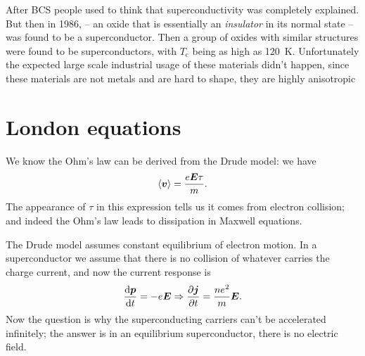 \documentclass[hyperref, a4paper]{article}
\begin{document}
After BCS people used to think that superconductivity was completely explained.
But then in 1986,  -- 
an oxide that is essentially an \emph{insulator} in its normal state -- 
was found to be a superconductor.
Then a group of oxides with similar structures were found to be superconductors,
with $T_{\text{c}}$ being as high as \SI{120}{K}.
Unfortunately the expected large scale industrial usage of these materials didn't happen,
since these materials are not metals and are hard to shape, 
they are highly anisotropic 

\section{London equations}

We know the Ohm's law can be derived from the Drude model: 
we have 
\begin{equation}
    \expval{\vb*{v}} = \frac{e \vb*{E} \tau}{m}.
\end{equation}
The appearance of $\tau$ in this expression tells us 
it comes from electron collision;
and indeed the Ohm's law leads to dissipation in Maxwell equations.

The Drude model assumes constant equilibrium of electron motion.
In a superconductor we assume that there is no collision 
of whatever carries the charge current,
and now the current response is 
\begin{equation}
    \dv{\vb*{p}}{t} = - e \vb*{E} \Rightarrow 
    \pdv{\vb*{j}}{t} = \frac{n e^2}{m} \vb*{E}. 
    \label{eq:current-response-sc}
\end{equation}
Now the question is why the superconducting carriers 
can't be accelerated infinitely;
the answer is in an equilibrium superconductor,
there is no electric field.
\end{document}
